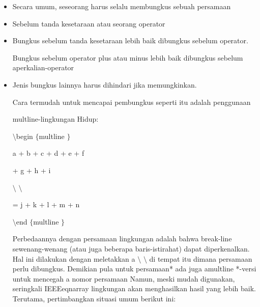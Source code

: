 \begin{itemize}
\item Secara umum, seseorang harus selalu membungkus sebuah persamaan \par
\noindent 
\item Sebelum tanda kesetaraan atau seorang operator \par
\noindent 
\item Bungkus sebelum tanda kesetaraan lebih baik dibungkus sebelum operator. \par
Bungkus sebelum operator plus atau minus lebih baik dibungkus sebelum aperkalian-operator \par
\noindent 
\item Jenis bungkus lainnya harus dihindari jika memungkinkan.
 \par
\vspace{12pt}
\vspace{12pt}
\noindent 
Cara termudah untuk mencapai pembungkus seperti itu adalah penggunaan \par
\noindent 
multline-lingkungan Hidup: \par
\vspace{12pt}
\noindent 
 $  \setminus  $begin $  \{  $multline $  \}  $ \par
\vspace{12pt}
\noindent 
a + b + c + d + e + f \par
\vspace{12pt}
\noindent 
+ g + h + i \par
\vspace{12pt}
\noindent 
 $  \setminus  $ $  \setminus  $ \par
\vspace{12pt}
\noindent 
= j + k + l + m + n \par
\vspace{12pt}
\noindent 
 $  \setminus  $end $  \{  $multline $  \}  $ \par
\vspace{12pt}
\noindent 
 \hspace*{0.5in} Perbedaannya dengan persamaan lingkungan adalah bahwa break-line sewenang-wenang (atau juga beberapa baris-istirahat) dapat diperkenalkan. Hal ini dilakukan dengan meletakkan a $  \setminus  $ $  \setminus  $ di tempat itu dimana persamaan perlu dibungkus. Demikian pula untuk persamaan* ada juga amultline *-versi untuk mencegah a nomor persamaan Namun, meski mudah digunakan, seringkali IEEEeqnarray lingkungan akan menghasilkan hasil yang lebih baik. Terutama, pertimbangkan situasi umum berikut ini: \par

\end{itemize}
